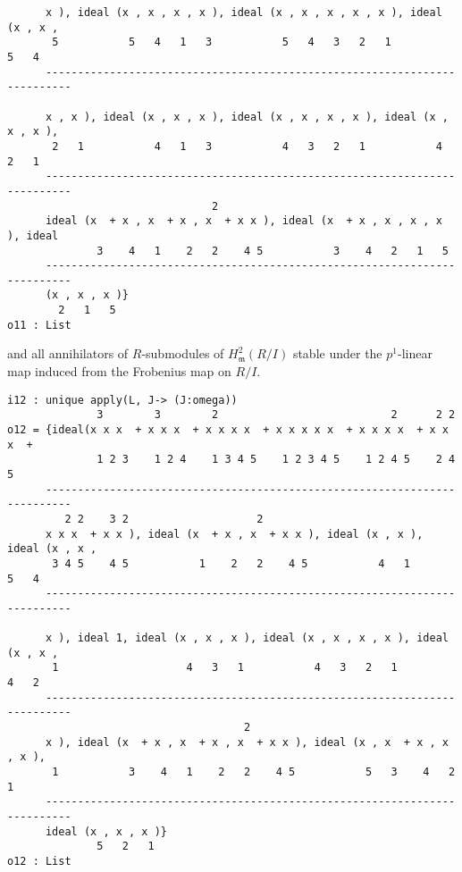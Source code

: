 \documentclass{amsart}
\begin{document}
\begin{example}
{\begin{verbatim}
      x ), ideal (x , x , x , x ), ideal (x , x , x , x , x ), ideal (x , x ,
       5           5   4   1   3           5   4   3   2   1           5   4
      --------------------------------------------------------------------------

      x , x ), ideal (x , x , x ), ideal (x , x , x , x ), ideal (x , x , x ),
       2   1           4   1   3           4   3   2   1           4   2   1
      --------------------------------------------------------------------------
                                2
      ideal (x  + x , x  + x , x  + x x ), ideal (x  + x , x , x , x ), ideal
              3    4   1    2   2    4 5           3    4   2   1   5
      --------------------------------------------------------------------------
      (x , x , x )}
        2   1   5
o11 : List
\end{verbatim}
}
\medskip

and all annihilators of $R$-submodules of $H^2_{\mathfrak{m}} (R/I)$ stable under the $p^1$-linear map induced from the Frobenius map on $R/I$.

\medskip
{\footnotesize
\begin{verbatim}
i12 : unique apply(L, J-> (J:omega))
              3        3        2                           2      2 2
o12 = {ideal(x x x  + x x x  + x x x x  + x x x x x  + x x x x  + x x x  +
              1 2 3    1 2 4    1 3 4 5    1 2 3 4 5    1 2 4 5    2 4 5
      --------------------------------------------------------------------------
         2 2    3 2                    2
      x x x  + x x ), ideal (x  + x , x  + x x ), ideal (x , x ), ideal (x , x ,
       3 4 5    4 5           1    2   2    4 5           4   1           5   4
      --------------------------------------------------------------------------

      x ), ideal 1, ideal (x , x , x ), ideal (x , x , x , x ), ideal (x , x ,
       1                    4   3   1           4   3   2   1           4   2
      --------------------------------------------------------------------------
                                     2
      x ), ideal (x  + x , x  + x , x  + x x ), ideal (x , x  + x , x , x ),
       1           3    4   1    2   2    4 5           5   3    4   2   1
      --------------------------------------------------------------------------
      ideal (x , x , x )}
              5   2   1
o12 : List
\end{verbatim}
}
\medskip

\end{example}
\end{document}
